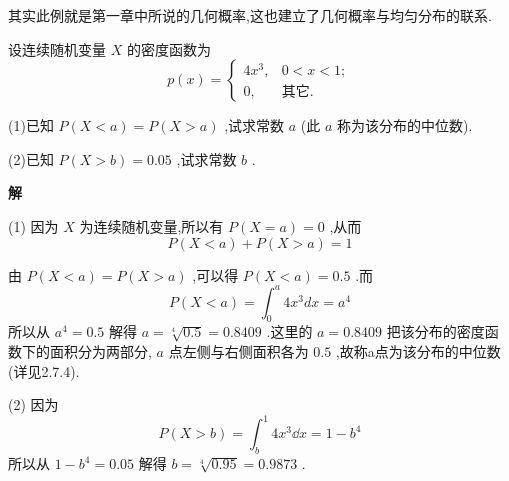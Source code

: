 其实此例就是第一章中所说的几何概率,这也建立了几何概率与均匀分布的联系.

\begin{example}\label{exam:2.1.12}
	设连续随机变量 $ X $ 的密度函数为	
	\[ 
	p(x)=\left\{\begin{array}{ll}
	{4 x^{3},} & {0<x<1}; \\ 
	{0},&{\text{其它}}.
	\end{array}\right.
	\]
	
	(1)已知 $ P(X<a)=P(X>a) $ ,试求常数 $ a $ (此 $ a $ 称为该分布的中位数).
	
	(2)已知 $ P(X>b)=0.05 $ ,试求常数 $ b $ .
	
	\textbf{解}
	
	(1) 因为 $ X $ 为连续随机变量,所以有 $ P(X=a)=0 $ ,从而
	\[ 
	P(X<a)+P(X>a)=1
	\]
	
	由 $ P(X<a)=P(X>a) $ ,可以得 $ P(X<a)=0.5 $ .而
	\[ 
	P(X<a)=\int_{0}^{a} 4 x^{3} d x=a^{4}
	\]
	所以从 $ a^4=0.5 $ 解得 $ a=\sqrt[4]{0.5}=0.8409 $ .这里的 $ a=0.8409 $ 把该分布的密度函数下的面积分为两部分, $ a $ 点左侧与右侧面积各为 $ 0.5 $ ,故称a点为该分布的中位数(详见2.7.4).
	
	(2) 因为
	\[ 
	P(X>b)=\int_{b}^{1} 4 x^{3} \dd x=1-b^{4}
	\]
	所以从 $ 1-b^{4}=0.05 $ 解得 $ b=\sqrt[4]{0.95}=0.9873 $ .
\end{example}

